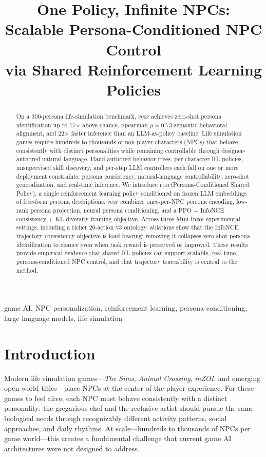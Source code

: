 \documentclass[conference]{IEEEtran}
\title{One Policy, Infinite NPCs:\\
Scalable Persona-Conditioned NPC Control\\
via Shared Reinforcement Learning Policies}
\author{%
  \IEEEauthorblockN{Yoosung Hong}
  \IEEEauthorblockA{Independent Researcher\\
    \url{https://github.com/yoosunghong/pcsp}}
}
\newcommand{\PCSP}{\textsc{pcsp}\xspace}
\begin{document}
\maketitle

\begin{abstract}
On a 300-persona life-simulation benchmark, \PCSP achieves zero-shot persona
identification up to 17$\times$ above chance, Spearman $\rho\!\approx\!0.73$
semantic-behavioral alignment, and 22$\times$ faster inference than an
LLM-as-policy baseline. Life simulation games require hundreds to thousands of
non-player characters (NPCs) that behave consistently with distinct personalities
while remaining controllable through designer-authored natural language.
Hand-authored behavior trees, per-character RL policies, unsupervised skill
discovery, and per-step LLM controllers each fail on one or more deployment
constraints: persona consistency, natural-language controllability, zero-shot
generalization, and real-time inference.
We introduce \PCSP (Persona-Conditioned Shared Policy), a single reinforcement
learning policy conditioned on frozen LLM embeddings of free-form persona
descriptions. \PCSP combines once-per-NPC persona encoding, low-rank persona
projection, neural persona conditioning, and a PPO + InfoNCE consistency + KL
diversity training objective. Across three Mini-Inzoi experimental settings,
including a richer 20-action v3 ontology, ablations show that the InfoNCE
trajectory-consistency objective is load-bearing: removing it collapses
zero-shot persona identification to chance even when task reward is preserved or
improved. These results provide empirical evidence that shared RL policies can
support scalable, real-time, persona-conditioned NPC control, and that trajectory
traceability is central to the method.
\end{abstract}

\begin{IEEEkeywords}
game AI, NPC personalization, reinforcement learning, persona conditioning,
large language models, life simulation
\end{IEEEkeywords}

\section{Introduction}
\label{sec:intro}

Modern life simulation games---\textit{The Sims}, \textit{Animal Crossing},
\textit{inZOI}, and emerging open-world titles---place NPCs at the center of
the player experience. For these games to feel alive, each NPC must behave
consistently with a distinct personality: the gregarious chef and the reclusive
artist should pursue the same biological needs through recognizably different
activity patterns, social approaches, and daily rhythms. At scale---hundreds to
thousands of NPCs per game world---this creates a fundamental challenge that
current game AI architectures were not designed to address.
\end{document}
